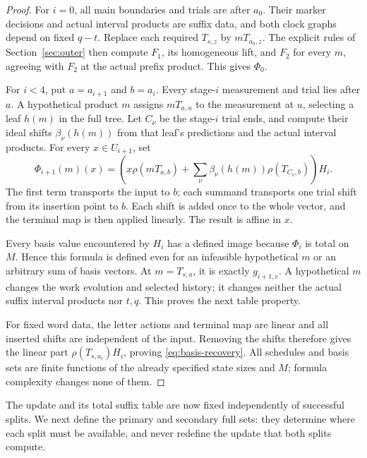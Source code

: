 \begin{proof}
For $i=0$, all main boundaries and trials are after $a_0$. Their
marker decisions and actual interval products are suffix data, and
both clock graphs depend on fixed $q-t$. Replace each required
$T_{s,z}$ by $mT_{a_0,z}$. The explicit rules of Section~\ref{sec:outer}
then compute $F_1$, its homogeneous lift, and $F_2$ for every $m$,
agreeing with $F_2$ at the actual prefix product. This gives $\Phi_0$.

For $i<4$, put $a=a_{i+1}$ and $b=a_i$. Every stage-$i$ measurement
and trial lies after $a$. A hypothetical product $m$ assigns
$mT_{a,u}$ to the measurement at $u$, selecting a leaf $h(m)$ in
the full tree. Let $C_\nu$ be the stage-$i$ trial ends, and compute
their ideal shifts $\beta_\nu(h(m))$ from that leaf's predictions
and the actual interval products. For every $x\in U_{i+1}$, set
\begin{equation}\label{eq:total-table-formula}
 \Phi_{i+1}(m)(x)=
 \left(x\rho(mT_{a,b})+
       \sum_\nu\beta_\nu(h(m))\rho(T_{C_\nu,b})\right)H_i.
\end{equation}
The first term transports the input to $b$; each summand transports
one trial shift from its insertion point to $b$. Each shift is added
once to the whole vector, and the terminal map is then applied
linearly. The result is affine in $x$.

Every basis value encountered by $H_i$ has a defined image because
$\Phi_i$ is total on $M$. Hence this formula is defined even for
an infeasible hypothetical $m$ or an arbitrary sum of basis vectors.
At $m=T_{s,a}$, it is exactly $g_{i+1,e}$. A hypothetical $m$ changes
the work evolution and selected history; it changes neither the
actual suffix interval products nor $t,q$. This proves the next
table property.

For fixed word data, the letter actions and terminal map are linear
and all inserted shifts are independent of the input. Removing the
shifts therefore gives the linear part $\rho(T_{s,a_i})H_i$, proving
\eqref{eq:basis-recovery}. All schedules and basis sets are finite
functions of the already specified state sizes and $M$; formula
complexity changes none of them.
\end{proof}

The update and its total suffix table are now fixed independently of
successful splits. We next define the primary and secondary full sets:
they determine where each split must be available, and never redefine
the update that both splits compute.

